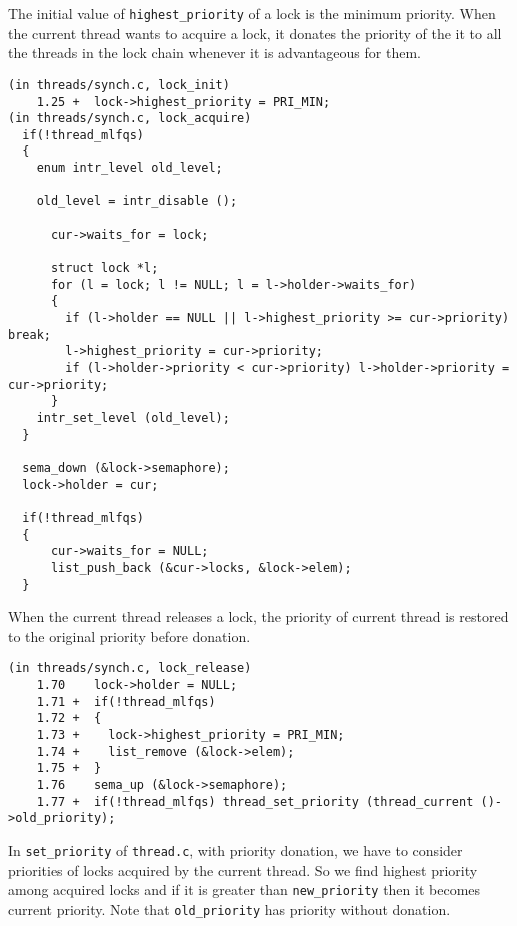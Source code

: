 \documentclass[a4paper,article,11pt,oneside]{article}
\begin{document}
The initial value of \texttt{highest\_priority} of a lock is the
minimum priority. When the current thread wants to acquire a lock, it
donates the priority of the it to all the threads in the lock chain
whenever it is advantageous for them.

\begin{verbatim}
(in threads/synch.c, lock_init)
    1.25 +  lock->highest_priority = PRI_MIN;
(in threads/synch.c, lock_acquire)
  if(!thread_mlfqs)
  {
    enum intr_level old_level;

    old_level = intr_disable ();

      cur->waits_for = lock;

      struct lock *l;
      for (l = lock; l != NULL; l = l->holder->waits_for)
      {
        if (l->holder == NULL || l->highest_priority >= cur->priority) break;
        l->highest_priority = cur->priority;
        if (l->holder->priority < cur->priority) l->holder->priority = cur->priority;
      }
    intr_set_level (old_level);
  }

  sema_down (&lock->semaphore);
  lock->holder = cur;

  if(!thread_mlfqs)
  {
      cur->waits_for = NULL;
      list_push_back (&cur->locks, &lock->elem);
  }
\end{verbatim}

When the current thread releases a lock, the priority of current
thread is restored to the original priority before donation. 

\begin{verbatim}
(in threads/synch.c, lock_release)
    1.70    lock->holder = NULL;
    1.71 +  if(!thread_mlfqs)
    1.72 +  {
    1.73 +    lock->highest_priority = PRI_MIN;
    1.74 +    list_remove (&lock->elem);
    1.75 +  }
    1.76    sema_up (&lock->semaphore);
    1.77 +  if(!thread_mlfqs) thread_set_priority (thread_current ()->old_priority);
\end{verbatim}

In \texttt{set\_priority} of \texttt{thread.c}, with priority
donation, we have to consider priorities of locks acquired by the
current thread. So we find highest priority among acquired locks and
if it is greater than \texttt{new\_priority} then it becomes current
priority. Note that \texttt{old\_priority} has priority without
donation.
\end{document}
